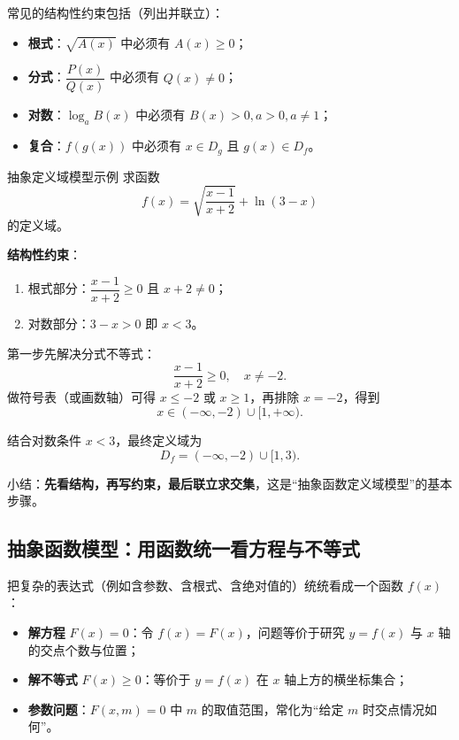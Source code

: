 \documentclass[a4paper,11pt]{ctexart}
\begin{document}
常见的结构性约束包括（列出并联立）：

\begin{itemize}
  \item \textbf{根式}：$\sqrt{A(x)}$ 中必须有 $A(x)\ge0$；
  \item \textbf{分式}：$\dfrac{P(x)}{Q(x)}$ 中必须有 $Q(x)\ne0$；
  \item \textbf{对数}：$\log_a B(x)$ 中必须有 $B(x)>0,a>0,a\ne1$；
  \item \textbf{复合}：$f(g(x))$ 中必须有 $x\in D_g$ 且 $g(x)\in D_f$。
\end{itemize}

\begin{examplebox}[mathnote coverage=line]{抽象定义域模型示例}
  求函数
  \[
    f(x)=\sqrt{\dfrac{x-1}{x+2}}+\ln(3-x)
  \]
  的定义域。

  \textbf{结构性约束}：
  \begin{enumerate}
    \item 根式部分：$\dfrac{x-1}{x+2}\ge0$ 且 $x+2\ne0$；
    \item 对数部分：$3-x>0$ 即 $x<3$。
  \end{enumerate}

  第一步先解决分式不等式：
  \[
    \dfrac{x-1}{x+2}\ge0,\quad x\ne-2.
  \]
  做符号表（或画数轴）可得 $x\le-2$ 或 $x\ge1$，再排除 $x=-2$，得到
  \[
    x\in(-\infty,-2)\cup[1,+\infty).
  \]

  结合对数条件 $x<3$，最终定义域为
  \[
    D_f = (-\infty,-2)\cup[1,3).
  \]
\end{examplebox}

小结：\textbf{先看结构，再写约束，最后联立求交集}，这是“抽象函数定义域模型”的基本步骤。

\subsection{抽象函数模型：用函数统一看方程与不等式}

把复杂的表达式（例如含参数、含根式、含绝对值的）统统看成一个函数 $f(x)$：

\begin{itemize}
  \item \textbf{解方程} $F(x)=0$：令 $f(x)=F(x)$，问题等价于研究 $y=f(x)$ 与 $x$ 轴的交点个数与位置；
  \item \textbf{解不等式} $F(x)\ge0$：等价于 $y=f(x)$ 在 $x$ 轴上方的横坐标集合；
  \item \textbf{参数问题}：$F(x,m)=0$ 中 $m$ 的取值范围，常化为“给定 $m$ 时交点情况如何”。
\end{itemize}
\end{document}
